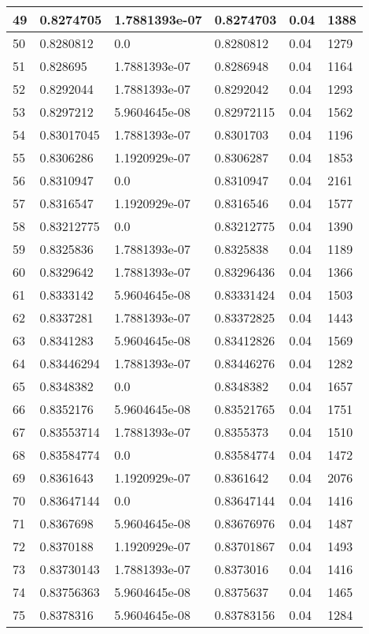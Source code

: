 \begin{longtable}{|l|l|l|l|l|l|}
49 & 0.8274705 & 1.7881393e-07 & 0.8274703 & 0.04 & 1388 \\ \hline 
50 & 0.8280812 & 0.0 & 0.8280812 & 0.04 & 1279 \\ \hline 
51 & 0.828695 & 1.7881393e-07 & 0.8286948 & 0.04 & 1164 \\ \hline 
52 & 0.8292044 & 1.7881393e-07 & 0.8292042 & 0.04 & 1293 \\ \hline 
53 & 0.8297212 & 5.9604645e-08 & 0.82972115 & 0.04 & 1562 \\ \hline 
54 & 0.83017045 & 1.7881393e-07 & 0.8301703 & 0.04 & 1196 \\ \hline 
55 & 0.8306286 & 1.1920929e-07 & 0.8306287 & 0.04 & 1853 \\ \hline 
56 & 0.8310947 & 0.0 & 0.8310947 & 0.04 & 2161 \\ \hline 
57 & 0.8316547 & 1.1920929e-07 & 0.8316546 & 0.04 & 1577 \\ \hline 
58 & 0.83212775 & 0.0 & 0.83212775 & 0.04 & 1390 \\ \hline 
59 & 0.8325836 & 1.7881393e-07 & 0.8325838 & 0.04 & 1189 \\ \hline 
60 & 0.8329642 & 1.7881393e-07 & 0.83296436 & 0.04 & 1366 \\ \hline 
61 & 0.8333142 & 5.9604645e-08 & 0.83331424 & 0.04 & 1503 \\ \hline 
62 & 0.8337281 & 1.7881393e-07 & 0.83372825 & 0.04 & 1443 \\ \hline 
63 & 0.8341283 & 5.9604645e-08 & 0.83412826 & 0.04 & 1569 \\ \hline 
64 & 0.83446294 & 1.7881393e-07 & 0.83446276 & 0.04 & 1282 \\ \hline 
65 & 0.8348382 & 0.0 & 0.8348382 & 0.04 & 1657 \\ \hline 
66 & 0.8352176 & 5.9604645e-08 & 0.83521765 & 0.04 & 1751 \\ \hline 
67 & 0.83553714 & 1.7881393e-07 & 0.8355373 & 0.04 & 1510 \\ \hline 
68 & 0.83584774 & 0.0 & 0.83584774 & 0.04 & 1472 \\ \hline 
69 & 0.8361643 & 1.1920929e-07 & 0.8361642 & 0.04 & 2076 \\ \hline 
70 & 0.83647144 & 0.0 & 0.83647144 & 0.04 & 1416 \\ \hline 
71 & 0.8367698 & 5.9604645e-08 & 0.83676976 & 0.04 & 1487 \\ \hline 
72 & 0.8370188 & 1.1920929e-07 & 0.83701867 & 0.04 & 1493 \\ \hline 
73 & 0.83730143 & 1.7881393e-07 & 0.8373016 & 0.04 & 1416 \\ \hline 
74 & 0.83756363 & 5.9604645e-08 & 0.8375637 & 0.04 & 1465 \\ \hline 
75 & 0.8378316 & 5.9604645e-08 & 0.83783156 & 0.04 & 1284 \\ \hline 
\end{longtable}